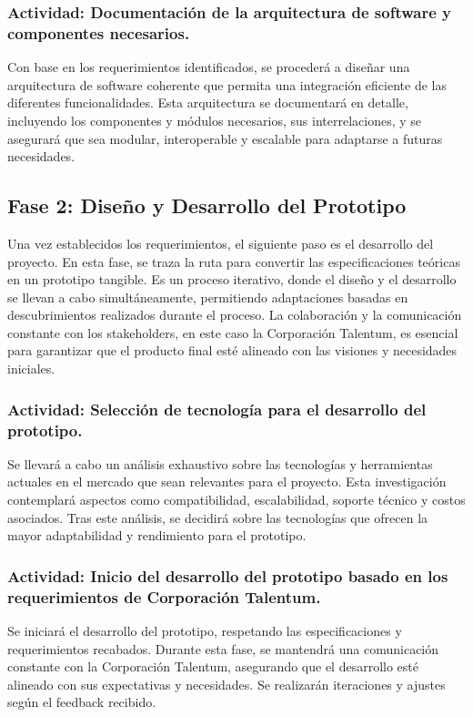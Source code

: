 \subsubsection{Actividad: Documentación de la arquitectura de software y componentes necesarios.}
Con base en los requerimientos identificados, se procederá a diseñar una arquitectura de software coherente que permita una integración eficiente de las diferentes funcionalidades. Esta arquitectura se documentará en detalle, incluyendo los componentes y módulos necesarios, sus interrelaciones, y se asegurará que sea modular, interoperable y escalable para adaptarse a futuras necesidades.

\subsection{Fase 2: Diseño y Desarrollo del Prototipo}
Una vez establecidos los requerimientos, el siguiente paso es el desarrollo del proyecto. En esta fase, se traza la ruta para convertir las especificaciones teóricas en un prototipo tangible. Es un proceso iterativo, donde el diseño y el desarrollo se llevan a cabo simultáneamente, permitiendo adaptaciones basadas en descubrimientos realizados durante el proceso. La colaboración y la comunicación constante con los stakeholders, en este caso la Corporación Talentum, es esencial para garantizar que el producto final esté alineado con las visiones y necesidades iniciales.

\subsubsection{Actividad: Selección de tecnología para el desarrollo del prototipo.}
Se llevará a cabo un análisis exhaustivo sobre las tecnologías y herramientas actuales en el mercado que sean relevantes para el proyecto. Esta investigación contemplará aspectos como compatibilidad, escalabilidad, soporte técnico y costos asociados. Tras este análisis, se decidirá sobre las tecnologías que ofrecen la mayor adaptabilidad y rendimiento para el prototipo.

\subsubsection{Actividad: Inicio del desarrollo del prototipo basado en los requerimientos de Corporación Talentum.}
Se iniciará el desarrollo del prototipo, respetando las especificaciones y requerimientos recabados. Durante esta fase, se mantendrá una comunicación constante con la Corporación Talentum, asegurando que el desarrollo esté alineado con sus expectativas y necesidades. Se realizarán iteraciones y ajustes según el feedback recibido.

